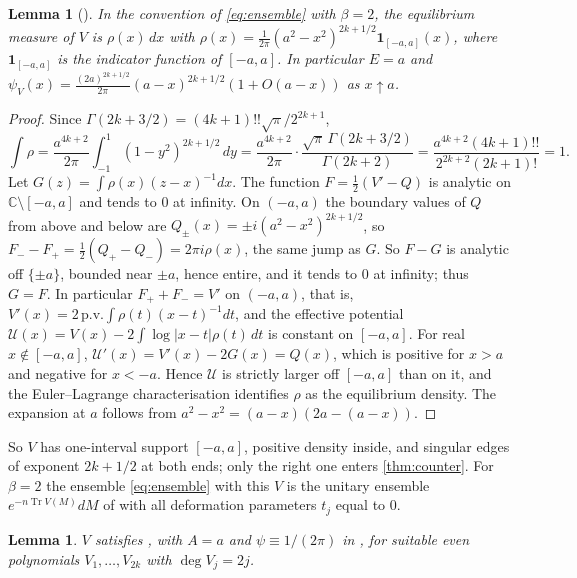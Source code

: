 \documentclass[11pt]{article}
\newtheorem{lemma}[theorem]{Lemma}
\theoremstyle{remark}
\newcommand{\C}{\mathbb{C}}
\begin{document}
\begin{lemma}[{\cite[Remark~1.7]{DDL}}]\label{lem:eq}
In the convention of \eqref{eq:ensemble} with $\beta=2$, the equilibrium measure of $V$ is $\rho(x)\,dx$ with
$\rho(x)=\frac1{2\pi}(a^2-x^2)^{2k+1/2}\mathbf 1_{[-a,a]}(x)$, where $\mathbf 1_{[-a,a]}$ is the indicator function of
$[-a,a]$. In particular $E=a$ and $\psi_V(x)=\frac{(2a)^{2k+1/2}}{2\pi}(a-x)^{2k+1/2}(1+O(a-x))$ as $x\uparrow a$.
\end{lemma}

\begin{proof}
Since $\Gamma(2k+3/2)=(4k+1)!!\sqrt\pi/2^{2k+1}$,
\[
\int\rho=\frac{a^{4k+2}}{2\pi}\int_{-1}^1(1-y^2)^{2k+1/2}\,dy=\frac{a^{4k+2}}{2\pi}\cdot\frac{\sqrt\pi\,\Gamma(2k+3/2)}{\Gamma(2k+2)}
=\frac{a^{4k+2}(4k+1)!!}{2^{2k+2}(2k+1)!}=1.
\]
Let $G(z)=\int\rho(x)(z-x)^{-1}dx$. The function $F=\frac12(V'-Q)$ is analytic on $\C\setminus[-a,a]$ and tends to $0$
at infinity. On $(-a,a)$ the boundary values of $Q$ from above and below are $Q_\pm(x)=\pm i(a^2-x^2)^{2k+1/2}$, so
$F_--F_+=\frac12(Q_+-Q_-)=2\pi i\rho(x)$, the same jump as $G$. So $F-G$ is analytic off $\{\pm a\}$, bounded near
$\pm a$, hence entire, and it tends to $0$ at infinity; thus $G=F$. In particular $F_++F_-=V'$ on $(-a,a)$, that is,
$V'(x)=2\,\mathrm{p.v.}\!\int\rho(t)(x-t)^{-1}dt$, and the effective potential
$\mathcal U(x)=V(x)-2\int\log|x-t|\rho(t)\,dt$ is constant on $[-a,a]$. For real $x\notin[-a,a]$, $\mathcal U'(x)=V'(x)-2G(x)=Q(x)$,
which is positive for $x>a$ and negative for $x<-a$. Hence $\mathcal U$ is strictly larger off $[-a,a]$ than on it, and the
Euler--Lagrange characterisation \cite[Theorem~I.3.3]{ST} identifies $\rho$ as the equilibrium density. The expansion
at $a$ follows from $a^2-x^2=(a-x)(2a-(a-x))$.
\end{proof}

So $V$ has one-interval support $[-a,a]$, positive density inside, and singular edges of exponent $2k+1/2$ at both
ends; only the right one enters \cref{thm:counter}. For $\beta=2$ the ensemble \eqref{eq:ensemble} with this $V$ is the
unitary ensemble $e^{-n\operatorname{Tr}V(M)}dM$ of \cite[(1.1)]{DDL} with all deformation parameters $t_j$ equal to $0$.

\begin{lemma}\label{lem:ddl}
$V$ satisfies \cite[Assumptions~1.1]{DDL}, with $A=a$ and $\psi\equiv1/(2\pi)$ in \cite[(1.40)]{DDL}, for suitable even
polynomials $V_1,\dots,V_{2k}$ with $\deg V_j=2j$.
\end{lemma}
\end{document}
